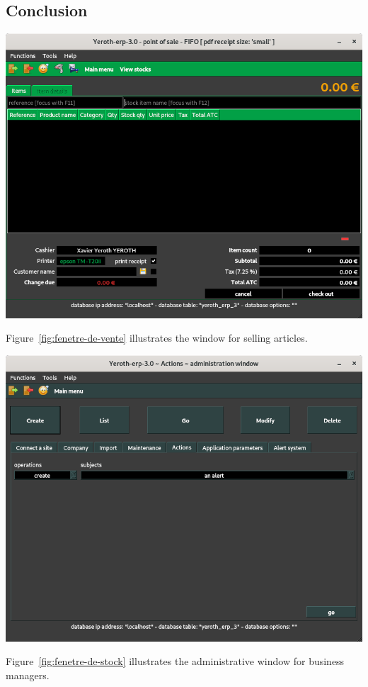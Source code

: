 \documentclass[a4paper, 10pt]{article}
\begin{document}
\begin{multicols}{2}
\section{Conclusion}
\begin{center}
\includegraphics[scale=0.33]{images/yeroth-erp-3-0-window-cashier.png}
\label{fig:fenetre-de-vente}
\end{center}

Figure~\ref{fig:fenetre-de-vente} illustrates
the window for selling articles.

\begin{center}
\includegraphics[scale=0.33]{images/yeroth-erp-3-0-admin-view-window.png}
\label{fig:fenetre-de-stock}
\end{center}

Figure~\ref{fig:fenetre-de-stock} illustrates
the administrative window for business managers.

\end{multicols}
\end{document}
